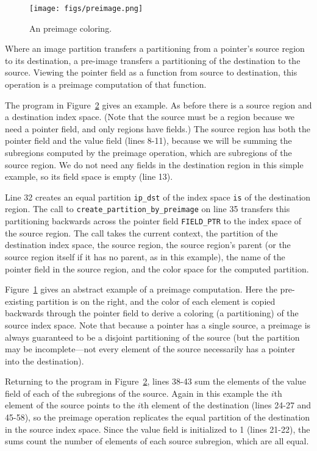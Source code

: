 \begin{figure}
  \centering
  \texttt{[image: figs/preimage.png]}
  \caption{An preimage coloring.}
  \label{fig:expreimage}
\end{figure}

Where an image partition transfers a partitioning from a pointer's source region to its destination, a pre-image transfers a partitioning of the destination to the source.  Viewing
the pointer field as a function from source to destination, this operation is a preimage computation of that function.

The program in Figure~\ref{fig:preimage} gives an example.  As before there is a source region and a destination index space.  (Note that the source must be a region because
we need a pointer field, and only regions have fields.)  The source region has both the pointer field and the value field (lines 8-11), because we will be summing the subregions computed
by the preimage operation, which are subregions of the source region.  We do not need any fields in the destination region in this simple example, so its field space is empty (line 13).

Line 32 creates an equal partition {\tt ip\_dst} of the index space {\tt is} of the destination region.  The call to {\tt create\_partition\_by\_preimage} on line 35 transfers this partitioning backwards across the pointer field {\tt FIELD\_PTR} to the index space of the source region.  The call takes the current context, the partition of the destination index space, the source region, the source region's parent (or the source region itself if it has no parent, as in this example), the name of the pointer field in the source region, and the color space for the computed partition.

Figure~\ref{fig:expreimage} gives an abstract example of a preimage computation.  Here the pre-existing partition is on the right, and the color of each element is copied backwards through the pointer field to derive a coloring (a partitioning) of the source index space.  Note that because a pointer has a single source, a preimage is always guaranteed to be a disjoint partitioning of the source (but the partition may be incomplete---not every element of the source necessarily has a pointer into the destination).

Returning to the program in Figure~\ref{fig:preimage}, lines 38-43 sum the elements of the value field of each of the subregions of the source.  Again in this example the $i$th element of the source points to the $i$th element of the destination (lines 24-27 and 45-58), so the preimage operation replicates the equal partition of the destination in the source index space.  Since the value field is initialized to 1 (lines 21-22), the sums count the number of elements of each source subregion, which are all equal.


\begin{figure}
  
  \caption{}
  \label{fig:preimage}
\end{figure}

